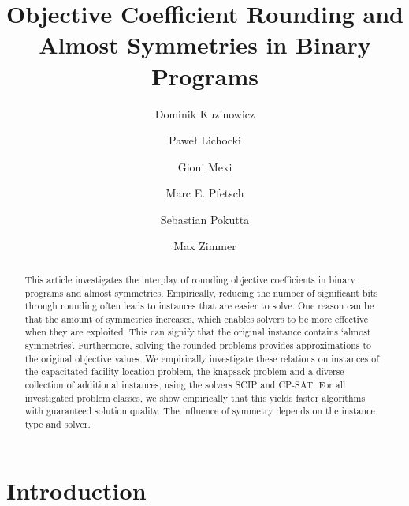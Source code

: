 \documentclass[runningheads]{llncs}
\begin{document}
%
\title{Objective Coefficient Rounding and Almost Symmetries in Binary Programs}

\author{
Dominik Kuzinowicz \and
Paweł Lichocki\and
Gioni Mexi \and
Marc E. Pfetsch \and
Sebastian Pokutta \and
Max Zimmer
}



%
\maketitle              %
%
\begin{abstract}
   This article investigates the interplay of rounding objective coefficients in binary programs and almost symmetries.
   Empirically, reducing the number of significant bits through rounding often leads to instances that are easier to solve.
   One reason can be that the amount of symmetries increases, which enables solvers to be more effective when they are exploited.
   This can signify that the original instance contains `almost symmetries'.
   Furthermore, solving the rounded problems provides approximations to the original objective values.
   We empirically investigate these relations on instances of the capacitated facility location problem, the knapsack problem and a diverse collection of additional instances, using the solvers SCIP and CP-SAT.
   For all investigated problem classes, we show empirically that this yields faster algorithms with guaranteed solution quality. The influence of symmetry depends on the instance type and solver.
\end{abstract}
%
%
%
\section{Introduction}
\end{document}
